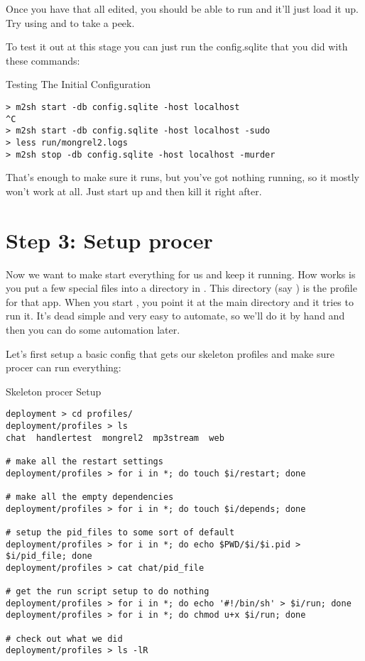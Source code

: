 Once you have that all edited, you should be able to run  and it'll just load it up.  Try using
 and  to take a peek.


To test it out at this stage you can just run the config.sqlite that you
did with these commands:

\begin{code}{Testing The Initial Configuration}
\begin{Verbatim}
> m2sh start -db config.sqlite -host localhost
^C
> m2sh start -db config.sqlite -host localhost -sudo
> less run/mongrel2.logs
> m2sh stop -db config.sqlite -host localhost -murder
\end{Verbatim}
\end{code}

That's enough to make sure it runs, but you've got nothing running,
so it mostly won't work at all.  Just start up and then kill it
right after.


\section{Step 3: Setup procer}

Now we want to make  start everything for us and keep
it running.  How  works is you put a few special
files into a directory in .  This directory (say )
is the profile for that app.  When you start , you
point it at the main  directory and it tries to run it.
It's dead simple and very easy to automate, so we'll do it by hand
and then you can do some automation later.

Let's first setup a basic config that gets our skeleton profiles
and make sure procer can run everything:

\begin{code}{Skeleton procer Setup}
\begin{Verbatim}
deployment > cd profiles/
deployment/profiles > ls
chat  handlertest  mongrel2  mp3stream  web

# make all the restart settings
deployment/profiles > for i in *; do touch $i/restart; done

# make all the empty dependencies
deployment/profiles > for i in *; do touch $i/depends; done

# setup the pid_files to some sort of default
deployment/profiles > for i in *; do echo $PWD/$i/$i.pid > $i/pid_file; done
deployment/profiles > cat chat/pid_file

# get the run script setup to do nothing
deployment/profiles > for i in *; do echo '#!/bin/sh' > $i/run; done
deployment/profiles > for i in *; do chmod u+x $i/run; done

# check out what we did
deployment/profiles > ls -lR
\end{Verbatim}
\end{code}

